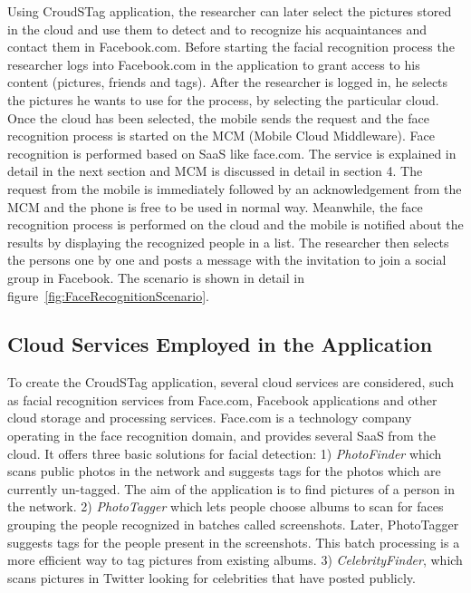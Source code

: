 Using CroudSTag application, the researcher can later select the pictures stored in the cloud and use them to detect and to recognize his acquaintances and contact them in Facebook.com. Before starting the facial recognition process the researcher logs into Facebook.com in the application to grant access to his content (pictures, friends and tags). After the researcher is logged in, he selects the pictures he wants to use for the process, by selecting the particular cloud. Once the cloud has been selected, the mobile sends the request and the face recognition process is started on the MCM (Mobile Cloud Middleware). Face recognition is performed based on SaaS like face.com. The service is explained in detail in the next section and MCM is discussed in detail in section 4. The request from the mobile is immediately followed by an acknowledgement from the MCM and the phone is free to be used in normal way. Meanwhile, the face recognition process is performed on the cloud and the mobile is notified about the results by displaying the recognized people in a list. The researcher then selects the persons one by one and posts a message with the invitation to join a social group in Facebook. The scenario is shown in detail in figure~\ref{fig:FaceRecognitionScenario}.


\subsection{Cloud Services Employed in the Application}

To create the CroudSTag application, several cloud services are considered, such as facial recognition services from Face.com, Facebook applications and other cloud storage and processing services. Face.com is a technology company operating in the face recognition domain, and provides several SaaS from the cloud. It offers three basic solutions for facial detection: 1) \textit{PhotoFinder} which scans public photos in the network and suggests tags for the photos which are currently un-tagged. The aim of the application is to find pictures of a person in the network. 2) \textit{PhotoTagger} which lets people choose albums to scan for faces grouping the people recognized in batches called screenshots. Later, PhotoTagger suggests tags for the people present in the screenshots. This batch processing is a more efficient way to tag pictures from existing albums. 3) \textit{CelebrityFinder}, which scans pictures in Twitter looking for celebrities that have posted publicly.


